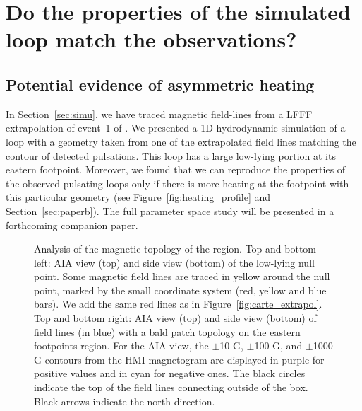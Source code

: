 \documentclass[preprint2]{aastex6}
\begin{document}
	
\section{Do the properties of the simulated loop match the observations?}\label{sec:obs}


	\subsection{Potential evidence of asymmetric heating}

In Section~\ref{sec:simu}, we have traced magnetic field-lines from a LFFF extrapolation of event~1 of \citet{froment2015}. We presented a 1D hydrodynamic simulation of a loop with a geometry taken from one of the extrapolated field lines matching the contour of detected pulsations. This loop has a large low-lying portion at its eastern footpoint. 
Moreover, we found that we can reproduce the properties of the observed pulsating loops only if there is more heating at the footpoint with this particular geometry (see Figure~\ref{fig:heating_profile} and Section~\ref{sec:paperb}). The full parameter space study will be presented in a forthcoming companion paper.



	\begin{figure*}
		\centering

		  \caption{Analysis of the magnetic topology of the region. Top and bottom left: AIA view (top) and side view (bottom) of the low-lying null point. Some magnetic field lines are traced in yellow around the null point, marked by the small coordinate system (red, yellow and blue bars). We add the same red lines as in Figure~\ref{fig:carte_extrapol}. Top and bottom right: AIA view (top) and side view (bottom) of field lines (in blue) with a bald patch topology on the eastern footpoints region. For the AIA view, the $\pm$10 G,  $\pm$100 G, and  $\pm$1000 G contours from the HMI magnetogram are displayed in purple for positive values and in cyan for negative ones. The black circles indicate the top of the field lines connecting outside of the box. Black arrows indicate the north direction.}
                 \label{fig:spe_loopfpt}
	\end{figure*}
\end{document}

